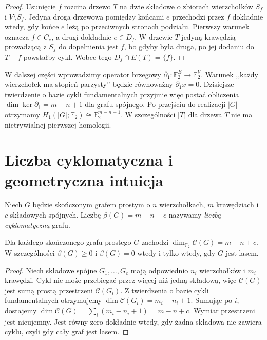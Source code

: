 \begin{proof}
Usunięcie $f$ rozcina drzewo $T$ na
dwie składowe o zbiorach wierzchołków
$S_f$ i $V\setminus S_f$. Jedyna droga
drzewowa pomiędzy końcami $e$ przechodzi
przez $f$ dokładnie wtedy, gdy końce
$e$ leżą po przeciwnych stronach podziału.
Pierwszy warunek oznacza $f\in C_e$,
a drugi dokładnie $e\in D_f$.
W drzewie $T$ jedyną krawędzią
prowadzącą z $S_f$ do dopełnienia jest
$f$, bo gdyby była druga, po jej
dodaniu do $T-f$ powstałby cykl.
Wobec tego $D_f\cap E(T)=\{f\}$.
\end{proof}

\begin{uwaga}
W dalszej części wprowadzimy operator brzegowy
$\partial_1:\mathbb F_2^E\to\mathbb F_2^V$.
Warunek ,,każdy wierzchołek ma stopień
parzysty'' będzie równoważny $\partial_1x=0$.
Dzisiejsze twierdzenie o bazie cykli fundamentalnych
przyjmie więc postać obliczenia
$\dim\ker\partial_1=m-n+1$ dla grafu spójnego.
Po przejściu do realizacji $|G|$ otrzymamy
$H_1(|G|;\mathbb F_2)\cong\mathbb F_2^{m-n+1}$.
W szczególności $|T|$ dla drzewa $T$
nie ma nietrywialnej pierwszej homologii.
\end{uwaga}

\section{Liczba cyklomatyczna i geometryczna intuicja}
\label{sec:tg-cyklomatyczna}

\begin{definicja}
Niech $G$ będzie skończonym grafem prostym
o $n$ wierzchołkach, $m$ krawędziach
i $c$ składowych spójnych. Liczbę
$\beta(G)=m-n+c$ nazywamy
\emph{liczbą cyklomatyczną} grafu.
\end{definicja}

\begin{twierdzenie}
Dla każdego skończonego grafu prostego $G$
zachodzi
$\dim_{\mathbb F_2}\mathcal C(G)=m-n+c$.
W szczególności $\beta(G)\ge0$ i
$\beta(G)=0$ wtedy i tylko wtedy, gdy
$G$ jest lasem.
\end{twierdzenie}

\begin{proof}
Niech składowe spójne $G_1,\ldots,G_c$
mają odpowiednio $n_i$ wierzchołków
i $m_i$ krawędzi. Cykl nie może przebiegać
przez więcej niż jedną składową, więc
$\mathcal C(G)$ jest sumą prostą
przestrzeni $\mathcal C(G_i)$. Z twierdzenia
o bazie cykli fundamentalnych otrzymujemy
$\dim\mathcal C(G_i)=m_i-n_i+1$.
Sumując po $i$, dostajemy
$\dim\mathcal C(G)=\sum_i(m_i-n_i+1)=m-n+c$.
Wymiar przestrzeni jest nieujemny.
Jest równy zero dokładnie wtedy, gdy
żadna składowa nie zawiera cyklu, czyli
gdy cały graf jest lasem.
\end{proof}

